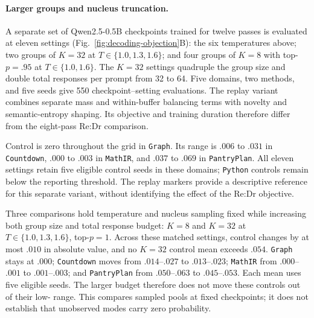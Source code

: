 \paragraph{Larger groups and nucleus truncation.}
A separate set of Qwen2.5-0.5B checkpoints trained for twelve passes is evaluated at
eleven settings (Fig.~\ref{fig:decoding-objection}B): the six temperatures
above; two groups of $K=32$ at $T\in\{1.0,1.3,1.6\}$; and four groups
of $K=8$ with top-$p=.95$ at $T\in\{1.0,1.6\}$. The $K=32$ settings
quadruple the group size and double total responses per prompt from 32 to
64. Five domains, two methods, and five seeds give 550 checkpoint--setting
evaluations. The replay variant combines separate mass and within-buffer
balancing terms with novelty and semantic-entropy shaping. Its objective
and training duration therefore differ from the eight-pass Re:Dr comparison.

Control \pmd{} is zero throughout the grid in \texttt{Graph}. Its range is $.006$
to $.031$ in \texttt{Countdown}, $.000$ to $.003$ in \texttt{MathIR}, and $.037$ to $.069$
in \texttt{PantryPlan}.
All eleven settings retain five eligible control seeds in these domains;
\texttt{Python} controls remain below the reporting threshold. The replay markers
provide a descriptive reference for this separate variant, without
identifying the effect of the Re:Dr objective.

Three comparisons hold temperature and nucleus sampling fixed while
increasing both group size and total response budget: $K=8$ and $K=32$ at
$T\in\{1.0,1.3,1.6\}$, top-$p=1$. Across these matched settings, control
\pmd{} changes by at most $.010$ in absolute value, and no
$K=32$ control mean exceeds $.054$. \texttt{Graph} stays at $.000$;
\texttt{Countdown} moves from $.014$--$.027$ to $.013$--$.023$;
\texttt{MathIR} from $.000$--$.001$ to $.001$--$.003$; and \texttt{PantryPlan}
from $.050$--$.063$ to $.045$--$.053$. Each mean uses five eligible seeds.
The larger budget therefore does not move these controls out of their
low-\pmd{} range. This compares sampled pools at fixed checkpoints; it does
not establish that unobserved modes carry zero probability.

